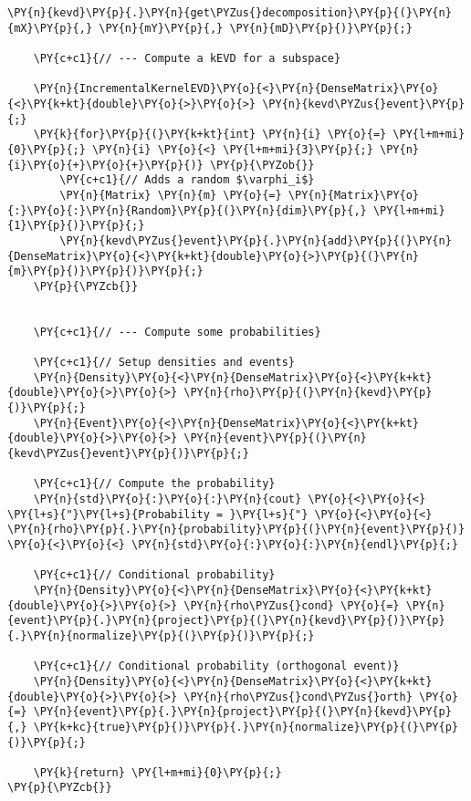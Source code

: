 \begin{Verbatim}[commandchars=\\\{\},codes={\catcode`\$=3\catcode`\^=7\catcode`\_=8}]
    \PY{n}{kevd}\PY{p}{.}\PY{n}{get\PYZus{}decomposition}\PY{p}{(}\PY{n}{mX}\PY{p}{,} \PY{n}{mY}\PY{p}{,} \PY{n}{mD}\PY{p}{)}\PY{p}{;}

    \PY{c+c1}{// --- Compute a kEVD for a subspace}
    
    \PY{n}{IncrementalKernelEVD}\PY{o}{<}\PY{n}{DenseMatrix}\PY{o}{<}\PY{k+kt}{double}\PY{o}{>}\PY{o}{>} \PY{n}{kevd\PYZus{}event}\PY{p}{;}
    \PY{k}{for}\PY{p}{(}\PY{k+kt}{int} \PY{n}{i} \PY{o}{=} \PY{l+m+mi}{0}\PY{p}{;} \PY{n}{i} \PY{o}{<} \PY{l+m+mi}{3}\PY{p}{;} \PY{n}{i}\PY{o}{+}\PY{o}{+}\PY{p}{)} \PY{p}{\PYZob{}}
        \PY{c+c1}{// Adds a random $\varphi_i$}
        \PY{n}{Matrix} \PY{n}{m} \PY{o}{=} \PY{n}{Matrix}\PY{o}{:}\PY{o}{:}\PY{n}{Random}\PY{p}{(}\PY{n}{dim}\PY{p}{,} \PY{l+m+mi}{1}\PY{p}{)}\PY{p}{;}
        \PY{n}{kevd\PYZus{}event}\PY{p}{.}\PY{n}{add}\PY{p}{(}\PY{n}{DenseMatrix}\PY{o}{<}\PY{k+kt}{double}\PY{o}{>}\PY{p}{(}\PY{n}{m}\PY{p}{)}\PY{p}{)}\PY{p}{;}
    \PY{p}{\PYZcb{}}

    
    \PY{c+c1}{// --- Compute some probabilities}
    
    \PY{c+c1}{// Setup densities and events}
    \PY{n}{Density}\PY{o}{<}\PY{n}{DenseMatrix}\PY{o}{<}\PY{k+kt}{double}\PY{o}{>}\PY{o}{>} \PY{n}{rho}\PY{p}{(}\PY{n}{kevd}\PY{p}{)}\PY{p}{;}
    \PY{n}{Event}\PY{o}{<}\PY{n}{DenseMatrix}\PY{o}{<}\PY{k+kt}{double}\PY{o}{>}\PY{o}{>} \PY{n}{event}\PY{p}{(}\PY{n}{kevd\PYZus{}event}\PY{p}{)}\PY{p}{;}
    
    \PY{c+c1}{// Compute the probability}
    \PY{n}{std}\PY{o}{:}\PY{o}{:}\PY{n}{cout} \PY{o}{<}\PY{o}{<} \PY{l+s}{"}\PY{l+s}{Probability = }\PY{l+s}{"} \PY{o}{<}\PY{o}{<} \PY{n}{rho}\PY{p}{.}\PY{n}{probability}\PY{p}{(}\PY{n}{event}\PY{p}{)} \PY{o}{<}\PY{o}{<} \PY{n}{std}\PY{o}{:}\PY{o}{:}\PY{n}{endl}\PY{p}{;}

    \PY{c+c1}{// Conditional probability}
    \PY{n}{Density}\PY{o}{<}\PY{n}{DenseMatrix}\PY{o}{<}\PY{k+kt}{double}\PY{o}{>}\PY{o}{>} \PY{n}{rho\PYZus{}cond} \PY{o}{=} \PY{n}{event}\PY{p}{.}\PY{n}{project}\PY{p}{(}\PY{n}{kevd}\PY{p}{)}\PY{p}{.}\PY{n}{normalize}\PY{p}{(}\PY{p}{)}\PY{p}{;} 

    \PY{c+c1}{// Conditional probability (orthogonal event)}
    \PY{n}{Density}\PY{o}{<}\PY{n}{DenseMatrix}\PY{o}{<}\PY{k+kt}{double}\PY{o}{>}\PY{o}{>} \PY{n}{rho\PYZus{}cond\PYZus{}orth} \PY{o}{=} \PY{n}{event}\PY{p}{.}\PY{n}{project}\PY{p}{(}\PY{n}{kevd}\PY{p}{,} \PY{k+kc}{true}\PY{p}{)}\PY{p}{.}\PY{n}{normalize}\PY{p}{(}\PY{p}{)}\PY{p}{;}
    
    \PY{k}{return} \PY{l+m+mi}{0}\PY{p}{;}
\PY{p}{\PYZcb{}}
\end{Verbatim}
